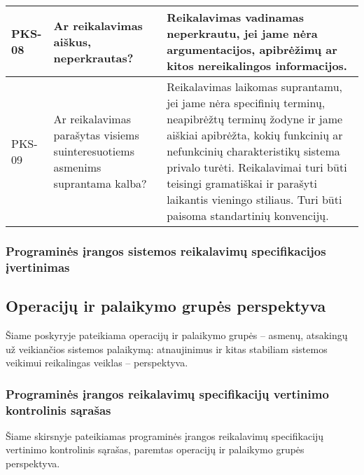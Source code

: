 \documentclass{VUMIFPSkursinis}
\begin{document}
\begin{center}
\begin{longtable}{|C{2cm}|L{5cm}|L{8cm}|}
		PKS-08                                                                        &
		Ar reikalavimas aiškus, neperkrautas?                                         &
		Reikalavimas vadinamas neperkrautu, jei jame nėra argumentacijos, apibrėžimų ar kitos nereikalingos informacijos.                                                                                                                                                                                                                                                                                                                             \\ \hline
		PKS-09                                                                        &
		Ar reikalavimas parašytas visiems suinteresuotiems asmenims suprantama kalba? &
		Reikalavimas laikomas suprantamu, jei jame nėra specifinių terminų, neapibrėžtų terminų žodyne ir jame aiškiai apibrėžta, kokių funkcinių ar nefunkcinių charakteristikų sistema privalo turėti. Reikalavimai turi būti teisingi gramatiškai ir parašyti laikantis vieningo stiliaus. Turi būti paisoma standartinių konvencijų.                                                                                                              \\ \hline
	\end{longtable}
\end{center}

\subsubsection{Programinės įrangos sistemos reikalavimų specifikacijos įvertinimas}

\subsection{Operacijų ir palaikymo grupės perspektyva}

Šiame poskyryje pateikiama operacijų ir palaikymo grupės -- asmenų, atsakingų už veikiančios
sistemos palaikymą: atnaujinimus ir kitas stabiliam sistemos veikimui reikalingas veiklas -- perspektyva.

\subsubsection{Programinės įrangos reikalavimų specifikacijų vertinimo kontrolinis sąrašas}

Šiame skirsnyje pateikiamas programinės įrangos reikalavimų specifikacijų vertinimo kontrolinis sąrašas,
paremtas operacijų ir palaikymo grupės perspektyva.
\end{document}
